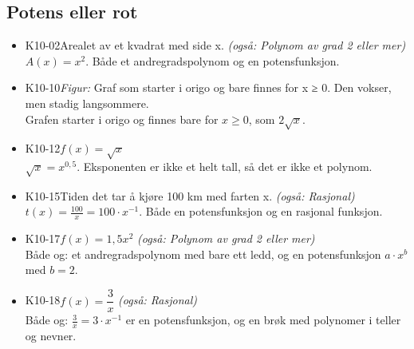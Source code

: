 \documentclass[11pt,a4paper]{article}
\begin{document}
\subsection*{Potens eller rot}
\begin{itemize}[leftmargin=1.2em, itemsep=0.35em]
\item \textsf{\small K10-02}\quad Arealet av et kvadrat med side x. \emph{(også: Polynom av grad 2 eller mer)}\\{\small\color{dempet}$A(x) = x^2$. Både et andregradspolynom og en potensfunksjon.}
\item \textsf{\small K10-10}\quad \emph{Figur:} Graf som starter i origo og bare finnes for x ≥ 0. Den vokser, men stadig langsommere.\\{\small\color{dempet}Grafen starter i origo og finnes bare for $x \geq 0$, som $2\sqrt{x}$.}
\item \textsf{\small K10-12}\quad $f(x) = \sqrt{x}$\\{\small\color{dempet}$\sqrt{x} = x^{0{,}5}$. Eksponenten er ikke et helt tall, så det er ikke et polynom.}
\item \textsf{\small K10-15}\quad Tiden det tar å kjøre 100 km med farten x. \emph{(også: Rasjonal)}\\{\small\color{dempet}$t(x) = \frac{100}{x} = 100 \cdot x^{-1}$. Både en potensfunksjon og en rasjonal funksjon.}
\item \textsf{\small K10-17}\quad $f(x) = 1{,}5x^2$ \emph{(også: Polynom av grad 2 eller mer)}\\{\small\color{dempet}Både og: et andregradspolynom med bare ett ledd, og en potensfunksjon $a \cdot x^b$ med $b = 2$.}
\item \textsf{\small K10-18}\quad $f(x) = \dfrac{3}{x}$ \emph{(også: Rasjonal)}\\{\small\color{dempet}Både og: $\frac{3}{x} = 3 \cdot x^{-1}$ er en potensfunksjon, og en brøk med polynomer i teller og nevner.}
\end{itemize}
\end{document}
